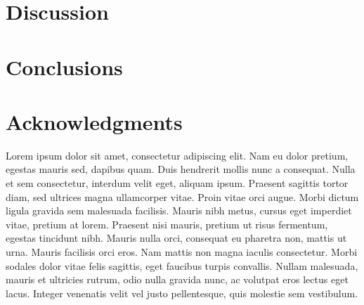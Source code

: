 \documentclass[extra]{gji}
\begin{document}
\section{Discussion}

\section{Conclusions}

\section{Acknowledgments}

Lorem ipsum dolor sit amet, consectetur adipiscing elit. Nam eu dolor pretium,
egestas mauris sed, dapibus quam. Duis hendrerit mollis nunc a consequat. Nulla
et sem consectetur, interdum velit eget, aliquam ipsum. Praesent sagittis
tortor diam, sed ultrices magna ullamcorper vitae. Proin vitae orci augue.
Morbi dictum ligula gravida sem malesuada facilisis. Mauris nibh metus, cursus
eget imperdiet vitae, pretium at lorem. Praesent nisi mauris, pretium ut risus
fermentum, egestas tincidunt nibh. Mauris nulla orci, consequat eu pharetra
non, mattis ut urna. Mauris facilisis orci eros. Nam mattis non magna iaculis
consectetur. Morbi sodales dolor vitae felis sagittis, eget faucibus turpis
convallis. Nullam malesuada, mauris et ultricies rutrum, odio nulla gravida
nunc, ac volutpat eros lectus eget lacus. Integer venenatis velit vel justo
pellentesque, quis molestie sem vestibulum.



\end{document}
